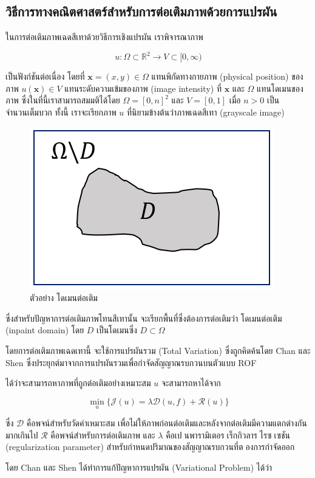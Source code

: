 \documentclass[hidelinks,a4paper,14pt]{article}
\numberwithin{equation}{section}							%
\begin{document}
{		\subsection{วิธีการทางคณิตศาสตร์สำหรับการต่อเติมภาพด้วยการแปรผัน}
		ในการต่อเติมภาพเฉดสีเทาด้วยวิธีการเชิงแปรผัน เราพิจารณาภาพ
		
		$$ u : \Omega \subset \mathbb{R}^2 \rightarrow V \subset [0,\infty) $$
		
		เป็นฟังก์ชันต่อเนื่อง โดยที่ $ \mathbf{x} = (x,y) \in \Omega $ แทนพิกัดทางกายภาพ (physical position) ของภาพ $ u(\mathbf{x}) \in V $ แทนระดับความเข้มของภาพ (image intensity) ที่ $ \mathbf{x} $ และ $ \Omega $ แทนโดเมนของภาพ ซึ่งในที่นี้เราสามารถสมมติได้โดย $ \Omega = [0,n]^2 $ และ $ V = [0,1] $ เมื่อ $n>0$ เป็นจำนวนเต็มบวก ทั้งนี้ เราจะเรียกภาพ $u$ ที่นิยามข้างต้นว่าภาพเฉดสีเทา (grayscale image)
			\begin{figure}[H]
			\centering
			\includegraphics[width=0.4\linewidth]{images/sample-domain.png}
			\caption{ตัวอย่าง โดเมนต่อเติม}
		\end{figure}
		ซึ่งสำหรับปัญหาการต่อเติมภาพโทนสีเทานั้น จะเรียกพื้นที่ซึ่งต้องการต่อเติมว่า โดเมนต่อเติม (inpaint domain) โดย $D$ เป็นโดเมนซึ่ง $D \subset \Omega$ 
		
		โดยการต่อเติมภาพเฉดเทานี้ จะใช้การแปรผันรวม (Total Variation) ซึ่งถูกคิดค้นโดย Chan และ Shen \cite{ref:rof-inpaint-chan-shen} ซึ่งประยุกต์มาจากการแปรผันรวมเพื่อกำจัดสัญญาณรบกวนบนตัวแบบ ROF \cite{ref:ROF-template}
		
		ได้ว่าจะสามารถหาภาพที่ถูกต่อเติมอย่างเหมาะสม $u$ จะสามารถหาได้จาก
		
			$$\min_{u} \{ \mathcal{J}(u)= \lambda \mathcal{D}(u,f)+  \mathcal{R}(u) \}$$
		
		ซึ่ง $ \mathcal{D} $ คือพจน์สำหรับวัดค่าเหมาะสม เพื่อไม่ให้ภาพก่อนต่อเติมและหลังจากต่อเติมมีความแตกต่างกันมากเกินไป $ \mathcal{R} $ คือพจน์สำหรับการต่อเติมภาพ และ $ \lambda $  คือเปนพารามิเตอรเร็กกิวลารไรซเซชัน (regularization parameter) สำหรับกำหนดปริมาณของสัญญาณรบกวนที่ตองการกำจัดออก 
		
		โดย Chan และ Shen ได้ทำการแก้ปัญหาการแปรผัน (Variational Problem) ได้ว่า
		
}
\end{document}
